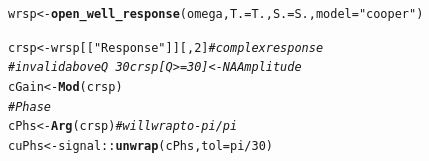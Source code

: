 \documentclass[10pt]{article}\usepackage[]{graphicx}\usepackage[]{color}
\makeatletter
\newcommand{\hlnum}[1]{\textcolor[rgb]{0.686,0.059,0.569}{#1}}%
\newcommand{\hlstr}[1]{\textcolor[rgb]{0.192,0.494,0.8}{#1}}%
\newcommand{\hlcom}[1]{\textcolor[rgb]{0.678,0.584,0.686}{\textit{#1}}}%
\newcommand{\hlopt}[1]{\textcolor[rgb]{0,0,0}{#1}}%
\newcommand{\hlstd}[1]{\textcolor[rgb]{0.345,0.345,0.345}{#1}}%
\newcommand{\hlkwb}[1]{\textcolor[rgb]{0.69,0.353,0.396}{#1}}%
\newcommand{\hlkwc}[1]{\textcolor[rgb]{0.333,0.667,0.333}{#1}}%
\newcommand{\hlkwd}[1]{\textcolor[rgb]{0.737,0.353,0.396}{\textbf{#1}}}%
\newenvironment{kframe}{%
 \def\at@end@of@kframe{}%
 \ifinner\ifhmode%
  \def\at@end@of@kframe{\end{minipage}}%
  \begin{minipage}{\columnwidth}%
 \fi\fi%
 \def\FrameCommand##1{\hskip\@totalleftmargin \hskip-\fboxsep
 \colorbox{shadecolor}{##1}\hskip-\fboxsep
     \hskip-\linewidth \hskip-\@totalleftmargin \hskip\columnwidth}%
 \MakeFramed {\advance\hsize-\width
   \@totalleftmargin\z@ \linewidth\hsize
   \@setminipage}}%
 {\par\unskip\endMakeFramed%
 \at@end@of@kframe}
\newenvironment{knitrout}{}{} %
\makeatother
\begin{document}
\begin{knitrout}
\color{fgcolor}\begin{kframe}
\begin{alltt}
\hlstd{wrsp} \hlkwb{<-} \hlkwd{open_well_response}\hlstd{(omega,} \hlkwc{T.} \hlstd{= T.,} \hlkwc{S.} \hlstd{= S.,} \hlkwc{model} \hlstd{=} \hlstr{"cooper"}\hlstd{)}
\end{alltt}


{\ttfamily\noindent\color{warningcolor}{\#\# Warning: water column height 'Hw' not given. using default\\\#\# Warning: aquifer thickness 'Ta' not given. using default\\\#\# Warning: this model has not yet been verified.}}\begin{alltt}
\hlstd{crsp} \hlkwb{<-} \hlstd{wrsp[[}\hlstr{"Response"}\hlstd{]][,} \hlnum{2}\hlstd{]}  \hlcom{# complex response}
\hlcom{# invalid above Q ~ 30 crsp[Q>=30] <- NA Amplitude}
\hlstd{cGain} \hlkwb{<-} \hlkwd{Mod}\hlstd{(crsp)}
\hlcom{# Phase}
\hlstd{cPhs} \hlkwb{<-} \hlkwd{Arg}\hlstd{(crsp)}  \hlcom{# will wrap to -pi/pi}
\hlstd{cuPhs} \hlkwb{<-} \hlstd{signal::}\hlkwd{unwrap}\hlstd{(cPhs,} \hlkwc{tol} \hlstd{= pi}\hlopt{/}\hlnum{30}\hlstd{)}
\end{alltt}
\end{kframe}
\end{knitrout}
\end{document}
